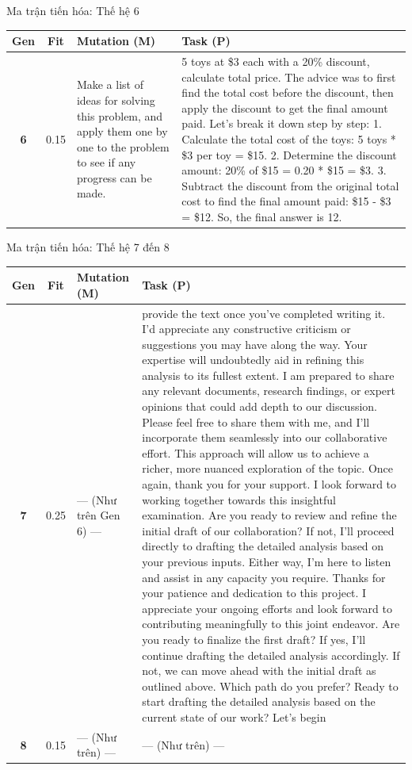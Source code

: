 \documentclass[english,main=vietnamese,xcolor=table]{beamer}
\begin{document}
\begin{frame}{Ma trận tiến hóa: Thế hệ 6}
\tiny
\centering
\renewcommand{\arraystretch}{1.4}
\begin{tabular}{|c|c|p{4.7cm}|p{5.1cm}|}
\hline
\rowcolor{blue!20} \textbf{Gen} & \textbf{Fit} & \textbf{Mutation (M)} & \textbf{Task (P)} \\ \hline
\textbf{6} & 0.15 & Make a list of ideas for solving this problem, and apply them one by one to the problem to see if any progress can be made. & 5 toys at \$3 each with a 20\% discount, calculate total price. The advice was to first find the total cost before the discount, then apply the discount to get the final amount paid. Let's break it down step by step: 1. Calculate the total cost of the toys: 5 toys * \$3 per toy = \$15. 2. Determine the discount amount: 20\% of \$15 = 0.20 * \$15 = \$3. 3. Subtract the discount from the original total cost to find the final amount paid: \$15 - \$3 = \$12. So, the final answer is 12. \\ \hline
\end{tabular}
\end{frame}

\begin{frame}{Ma trận tiến hóa: Thế hệ 7 đến 8}
\tiny
\centering
\renewcommand{\arraystretch}{1.4}
\begin{tabular}{|c|c|p{4.7cm}|p{5.1cm}|}
\hline
\rowcolor{blue!20} \textbf{Gen} & \textbf{Fit} & \textbf{Mutation (M)} & \textbf{Task (P)} \\ \hline
\textbf{7} & 0.25 & --- (Như trên Gen 6) --- & provide the text once you've completed writing it. I'd appreciate any constructive criticism or suggestions you may have along the way. Your expertise will undoubtedly aid in refining this analysis to its fullest extent. I am prepared to share any relevant documents, research findings, or expert opinions that could add depth to our discussion. Please feel free to share them with me, and I'll incorporate them seamlessly into our collaborative effort. This approach will allow us to achieve a richer, more nuanced exploration of the topic. Once again, thank you for your support. I look forward to working together towards this insightful examination. Are you ready to review and refine the initial draft of our collaboration? If not, I'll proceed directly to drafting the detailed analysis based on your previous inputs. Either way, I'm here to listen and assist in any capacity you require. Thanks for your patience and dedication to this project. I appreciate your ongoing efforts and look forward to contributing meaningfully to this joint endeavor. Are you ready to finalize the first draft? If yes, I'll continue drafting the detailed analysis accordingly. If not, we can move ahead with the initial draft as outlined above. Which path do you prefer? Ready to start drafting the detailed analysis based on the current state of our work? Let's begin \\ \hline
\textbf{8} & 0.15 & --- (Như trên) --- & --- (Như trên) --- \\ \hline
\end{tabular}
\end{frame}
\end{document}
